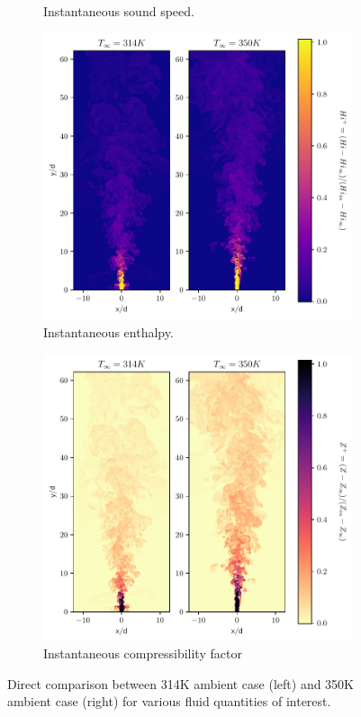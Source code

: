 \begin{figure}[H]
\begin{subfigure}{0.5\textwidth}
	\caption{Instantaneous sound speed.} \label{noniso_Cs_1}
\end{subfigure}
\vfill
\begin{subfigure}{0.5\textwidth}
	\centering
	\includegraphics[scale=.45]{figures/Plots/vertical/Hi_scaled_vert_noniso.pdf}
	\caption{Instantaneous enthalpy.} \label{noniso_Hi_1}
\end{subfigure}
\hfill
\begin{subfigure}{0.5\textwidth}
	\centering
	\includegraphics[scale=.45]{figures/Plots/vertical/Z_scaled_vert_noniso.pdf}
	\caption{Instantaneous compressibility factor} \label{noniso_Z_1}
\end{subfigure}
\caption{Direct comparison between 314K ambient case (left) and 350K ambient case (right) for various fluid quantities of interest.}
\label{noniso_various_features}
\end{figure}

